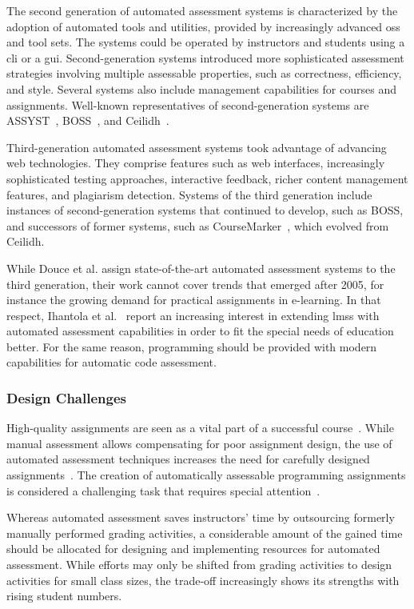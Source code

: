 The second generation of automated assessment systems is characterized by the adoption of automated tools and utilities, provided by increasingly advanced \glspl{os} and tool sets. The systems could be operated by instructors and students using a \gls{cli} or a \gls{gui}. Second-generation systems introduced more sophisticated assessment strategies involving multiple assessable properties, such as correctness, efficiency, and style. Several systems also include management capabilities for courses and assignments. Well-known representatives of second-generation systems are ASSYST~\cite{jackson1997grading}, BOSS~\cite{joy2005boss}, and Ceilidh~\cite{benford1995ceilidh}.

Third-generation automated assessment systems took advantage of advancing web technologies. They comprise features such as web interfaces, increasingly sophisticated testing approaches, interactive feedback, richer content management features, and plagiarism detection. Systems of the third generation include instances of second-generation systems that continued to develop, such as BOSS, and successors of former systems, such as CourseMarker~\cite{higgins2003coursemarker}, which evolved from Ceilidh.

While Douce et al. assign state-of-the-art automated assessment systems to the third generation, their work cannot cover trends that emerged after 2005, for instance the growing demand for practical assignments in e-learning. In that respect, Ihantola et al.~\cite{ihantola2010review} report an increasing interest in extending \glspl{lms} with automated assessment capabilities in order to fit the special needs of \cs education better. For the same reason, programming \moocs should be provided with modern capabilities for automatic code assessment.

\subsubsection{Design Challenges}

High-quality assignments are seen as a vital part of a successful course~\cite{feldman1996quest}. While manual assessment allows compensating for poor assignment design, the use of automated assessment techniques increases the need for carefully designed assignments~\cite{pieterse2013automated}. The creation of automatically assessable programming assignments is considered a challenging task that requires special attention~\cite{ala2005survey}.

Whereas automated assessment saves instructors' time by outsourcing formerly manually performed grading activities, a considerable amount of the gained time should be allocated for designing and implementing resources for automated assessment. While efforts may only be shifted from grading activities to design activities for small class sizes, the trade-off increasingly shows its strengths with rising student numbers.

